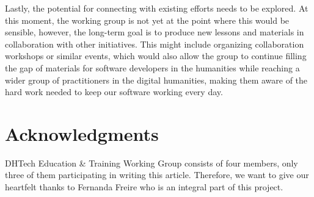 \documentclass[final]{anthology-ch} %
\begin{document}
Lastly, the potential for connecting with existing efforts needs to be explored. At this moment, the working group is not yet at the point where this would be sensible, however, the long-term goal is to produce new lessons and materials in collaboration with other initiatives. This might include organizing collaboration workshops or similar events, which would also allow the group to continue filling the gap of materials for software developers in the humanities while reaching a wider group of practitioners in the digital humanities, making them aware of the hard work needed to keep our software working every day.

\section*{Acknowledgments}

DHTech Education \& Training Working Group consists of four members, only three of them participating in writing this article. Therefore, we want to give our heartfelt thanks to Fernanda Freire who is an integral part of this project. 

\printbibliography

\appendix
\end{document}
